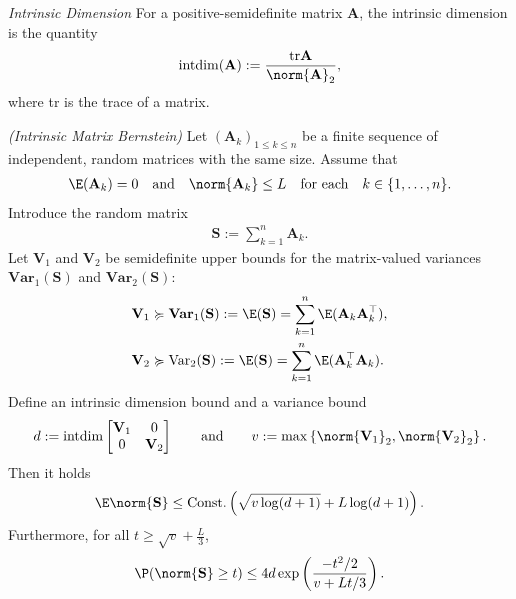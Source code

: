 \begin{definition}
  \emph{Intrinsic Dimension}
  \label{rmineq_intrinsic_bernstein}
  For a positive-semidefinite matrix $\mathbf{A}$,
  the intrinsic dimension is the quantity
  \begin{gather*}
    \mathrm{intdim}
    (\mathbf{A})
    :=
    \frac{\mathrm{tr}\mathbf{A}}{\norm{\mathbf{A}}_2}
    ,
  \end{gather*}
  where tr is the trace of a matrix.
\end{definition}
\begin{theorem}
  \emph{(Intrinsic Matrix Bernstein)}
  \label{rmineq_bernstein}
  Let $(\mathbf{A}_k)_{1\le k \le n}$  be a finite sequence of independent, random matrices with the same size. Assume that
    \begin{gather}
      \E(\mathbf{A}_k)=0\quad\text{and}\quad\norm{\mathbf{A}_k}\le L \quad \text{for each}\quad  k\in \{1,\ldots,n\}.
    \end{gather}
  Introduce the random matrix
      \begin{gather*}
        \mathbf{S}:=\sum_{k=1}^n \mathbf{A}_k.
      \end{gather*}
  Let 
  $\mathbf{V}_1$ 
  and
  $\mathbf{V}_2$ 
  be semidefinite upper bounds for the matrix-valued variances
  $\mathbf{Var}_1(\mathbf{S})$
  and
  $\mathbf{Var}_2(\mathbf{S})$:
  \begin{align*}
    \mathbf{V}_1 
    &\succcurlyeq 
    \mathbf{Var}_1(\mathbf{S})
    :=
    \E(\mathbf{S})
    =
    \sum_{k = 1}^{n}
    \E(\mathbf{A}_k \mathbf{A}_k^\top),\\
    \mathbf{V}_2 
    &\succcurlyeq 
    \text{Var}_2(\mathbf{S})
    :=
    \E(\mathbf{S})
    =
    \sum_{k = 1}^{n}
    \E(\mathbf{A}_k^\top \mathbf{A}_k)
    .
  \end{align*}
  Define an intrinsic dimension bound and a variance bound
  \begin{gather}
    \label{ rmineq_intrinsic_bernstein_intdim_var_bound }
    d
    :=
    \mathrm{intdim}
    \begin{bmatrix}
      \mathbf{V}_1 & 0 \\
      0   & \mathbf{V}_2
    \end{bmatrix}
    \qquad
    \text{and}
    \qquad
    v
    :=
    \max
    \left\{ \norm{\mathbf{V}_1}_2, \norm{\mathbf{V}_2}_2 \right\}
    .
  \end{gather}
  Then 
  it holds
      \begin{align}
        \label{rmineq_intrinsic_bernstein_expectation_bound}
        \E\norm{\mathbf{S}}\le \text{Const.}\left( \sqrt{v\log(d+1)} + L\log(d+1) \right).
      \end{align}
    Furthermore, for all 
  $
    t
    \ge
    \sqrt{v}
    +
    \frac{L}{3}
  $,
      \begin{gather}
        \label{rmineq_intrinsic_bernstein_probability_bound}
        \P(\norm{\mathbf{S}}\ge t)\le 4d \exp\left(\frac{-t^2/2}{v+Lt/3} \right).
      \end{gather}
\end{theorem}

